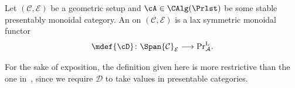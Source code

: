 \begin{defn}\label{defn:six-func}
  Let $(\mathcal C, \mathcal E)$ be a geometric setup and $\cA\in \CAlg(\Prlst)$ be some stable presentably monoidal category. 
  An  on 
  $(\mathcal C,\mathcal E)$ is a lax symmetric monoidal functor
  \[
    \mdef{\cD}\colon\Span{\mathcal C}_{\mathcal E}\longrightarrow
    \mathrm{Pr}^{\mathrm{L}}_{\mathcal A}.
  \]
\end{defn}
For the sake of exposition, the definition given here is more restrictive than the one in~\cite{Mann2022}, since we require $\mathcal D$ to take values in presentable categories.

\medskip

